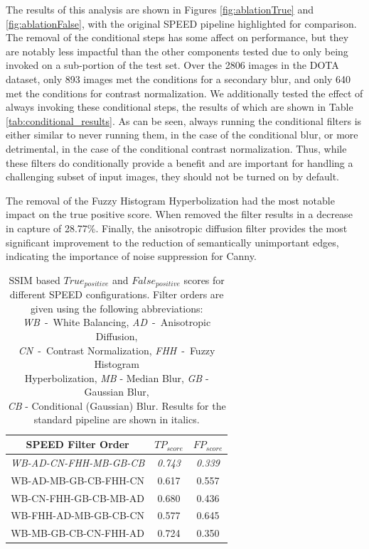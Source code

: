 \documentclass[conference]{IEEEtran}
\begin{document}
The results of this analysis are shown in Figures \ref{fig:ablationTrue} and \ref{fig:ablationFalse}, with the original SPEED pipeline highlighted for comparison. The removal of the conditional steps has some affect on performance, but they are notably less impactful than the other components tested due to only being invoked on a sub-portion of the test set. Over the 2806 images in the DOTA dataset, only 893 images met the conditions for a secondary blur, and only 640 met the conditions for contrast normalization. We additionally tested the effect of always invoking these conditional steps, the results of which are shown in Table \ref{tab:conditional_results}. As can be seen, always running the conditional filters is either similar to never running them, in the case of the conditional blur, or more detrimental, in the case of the conditional contrast normalization. Thus, while these filters do conditionally provide a benefit and are important for handling a challenging subset of input images, they should not be turned on by default. 

The removal of the Fuzzy Histogram Hyperbolization had the most notable impact on the true positive score. When removed the filter results in a decrease in capture of 28.77\%. Finally, the anisotropic diffusion filter provides the most significant improvement to the reduction of semantically unimportant edges, indicating the importance of noise suppression for Canny.



\begin{table}[]
    \centering
    \begin{tabular}{ccc}
    SPEED Filter Order  & $TP_{score}$  & $FP_{score}$ \\
     \hline
    \emph{WB-AD-CN-FHH-MB-GB-CB} & \emph{0.743} &\emph{0.339}  \\
    WB-AD-MB-GB-CB-FHH-CN & 0.617 & 0.557     \\
    WB-CN-FHH-GB-CB-MB-AD & 0.680 & 0.436     \\
    WB-FHH-AD-MB-GB-CB-CN & 0.577 & 0.645     \\
    WB-MB-GB-CB-CN-FHH-AD & 0.724 & 0.350     
    \end{tabular}
    \caption{SSIM based $True_{positive}$ and $False_{positive}$ scores for different SPEED configurations. Filter orders are given using the following abbreviations: \\ \emph{WB}~-~White Balancing, \emph{AD}~-~Anisotropic Diffusion, \\ \emph{CN}~-~Contrast Normalization, \emph{FHH}~-~Fuzzy Histogram \\ Hyperbolization, \emph{MB} - Median Blur, \emph{GB} - Gaussian Blur, \\ \emph{CB} - Conditional (Gaussian) Blur. Results for the standard pipeline are shown in italics. \label{tab:order_results}}
\end{table}
\end{document}
